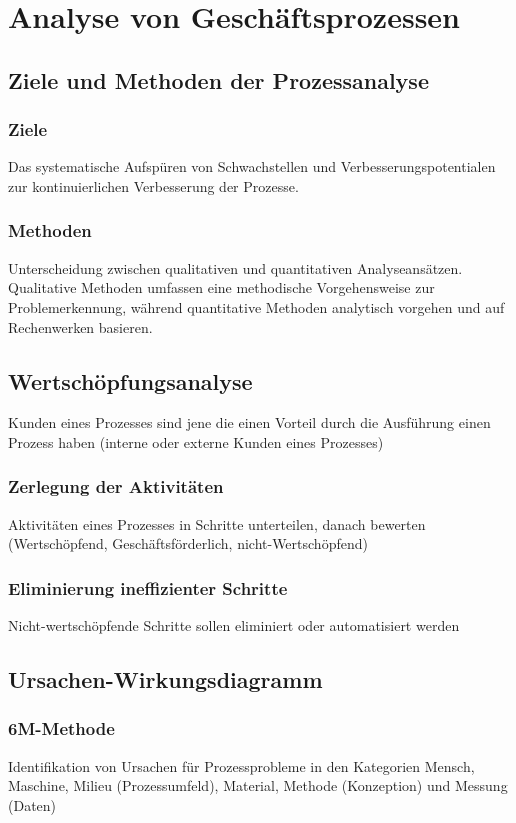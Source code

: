 \section{Analyse von Geschäftsprozessen}

\subsection{Ziele und Methoden der Prozessanalyse}
    \subsubsection*{Ziele}
        Das systematische Aufspüren von Schwachstellen und Verbesserungspotentialen zur kontinuierlichen Verbesserung der Prozesse.
    \subsubsection*{Methoden}
        Unterscheidung zwischen qualitativen und quantitativen Analyseansätzen. Qualitative Methoden umfassen eine methodische Vorgehensweise zur Problemerkennung, während quantitative Methoden analytisch vorgehen und auf Rechenwerken basieren.

\subsection{Wertschöpfungsanalyse}
    Kunden eines Prozesses sind jene die einen Vorteil durch die Ausführung einen Prozess haben (interne oder externe Kunden eines Prozesses)
    \subsubsection*{Zerlegung der Aktivitäten}
        Aktivitäten eines Prozesses in Schritte unterteilen, danach bewerten (Wertschöpfend, Geschäftsförderlich, nicht-Wertschöpfend)
    \subsubsection*{Eliminierung ineffizienter Schritte}
        Nicht-wertschöpfende Schritte sollen eliminiert oder automatisiert werden

\subsection{Ursachen-Wirkungsdiagramm}
    \subsubsection*{6M-Methode}
        Identifikation von Ursachen für Prozessprobleme in den Kategorien Mensch, Maschine, Milieu (Prozessumfeld), Material, Methode (Konzeption) und Messung (Daten)
